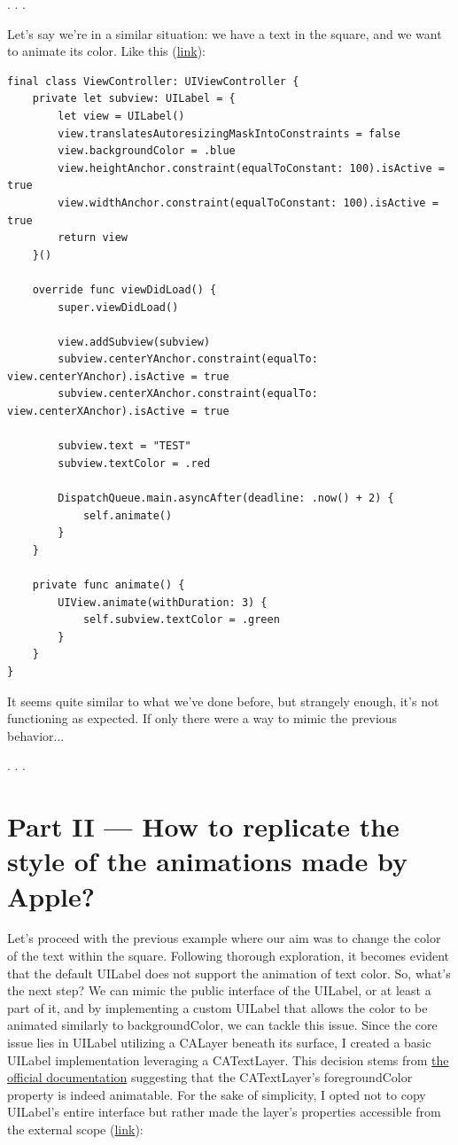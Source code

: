 \documentclass{article}
\newcommand{\separator}{\vspace{5mm}\centerline{. . .}\vspace{5mm}}
\begin{document}
\separator

Let's say we're in a similar situation: we have a text in the square, and we want to animate its color. Like this (\href{https://github.com/stateman92/Medium-AnimatableProperties/commit/ae75772afc34591f445376d283ba3a5dca3c370d}{link}):

\begin{lstlisting}
final class ViewController: UIViewController {
    private let subview: UILabel = {
        let view = UILabel()
        view.translatesAutoresizingMaskIntoConstraints = false
        view.backgroundColor = .blue
        view.heightAnchor.constraint(equalToConstant: 100).isActive = true
        view.widthAnchor.constraint(equalToConstant: 100).isActive = true
        return view
    }()

    override func viewDidLoad() {
        super.viewDidLoad()

        view.addSubview(subview)
        subview.centerYAnchor.constraint(equalTo: view.centerYAnchor).isActive = true
        subview.centerXAnchor.constraint(equalTo: view.centerXAnchor).isActive = true

        subview.text = "TEST"
        subview.textColor = .red
        
        DispatchQueue.main.asyncAfter(deadline: .now() + 2) {
            self.animate()
        }
    }

    private func animate() {
        UIView.animate(withDuration: 3) {
            self.subview.textColor = .green
        }
    }
}
\end{lstlisting}

It seems quite similar to what we've done before, but strangely enough, it's not functioning as expected. If only there were a way to mimic the previous behavior...

\separator

\section{Part II — How to replicate the style of the animations made by Apple?}
\label{sec:part2}

Let's proceed with the previous example where our aim was to change the color of the text within the square. Following thorough exploration, it becomes evident that the default UILabel does not support the animation of text color. So, what's the next step? We can mimic the public interface of the UILabel, or at least a part of it, and by implementing a custom UILabel that allows the color to be animated similarly to backgroundColor, we can tackle this issue. Since the core issue lies in UILabel utilizing a CALayer beneath its surface, I created a basic UILabel implementation leveraging a CATextLayer. This decision stems from \href{https://developer.apple.com/documentation/quartzcore/catextlayer/1515305-foregroundcolor}{the official documentation} suggesting that the CATextLayer's foregroundColor property is indeed animatable. For the sake of simplicity, I opted not to copy UILabel's entire interface but rather made the layer's properties accessible from the external scope (\href{https://github.com/stateman92/Medium-AnimatableProperties/commit/8225a22d5f8ba429fac19dfe08e72c0d48340dbb}{link}):
\end{document}
